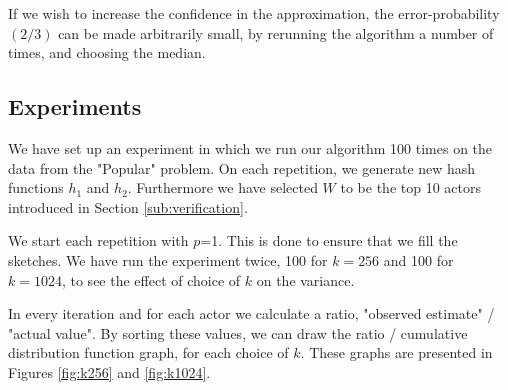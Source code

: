 \documentclass[a4paper,11pt]{article}
\begin{document}
If we wish to increase the confidence in the approximation, the error-probability $(2/3)$ can be made arbitrarily small, by rerunning the algorithm a number of times, and choosing the median.

\subsection{Experiments}
We have set up an experiment in which we run our algorithm 100 times on the data from the "Popular" problem.
On each repetition, we generate new hash functions $h_1$ and $h_2$.
Furthermore we have selected $W$ to be the top 10 actors introduced in Section \ref{sub:verification}. 

We start each repetition with $p$=1. This is done to ensure that we fill the sketches.
We have run the experiment twice, 100 for $k=256$ and 100 for $k=1024$, to see the effect of choice of $k$ on the variance.

In every iteration and for each actor we calculate a ratio, "observed estimate" / "actual value". By sorting these values, we can draw the ratio / cumulative distribution function graph, for each choice of $k$. These graphs are presented in Figures \ref{fig:k256} and \ref{fig:k1024}.
\end{document}
